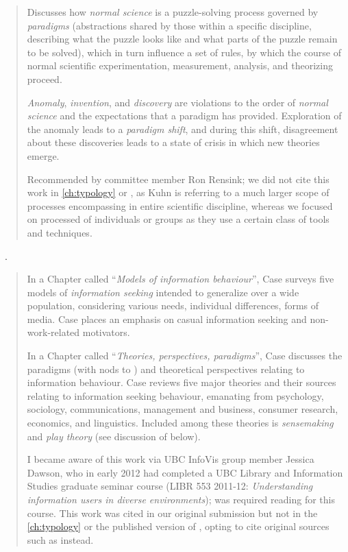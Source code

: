 \begin{quotation}
    Discusses how {\it normal science} is a puzzle-solving process governed by {\it paradigms} (abstractions shared by those within a specific discipline, describing what the puzzle looks like and what parts of the puzzle remain to be solved), which in turn influence a set of rules, by which the course of normal scientific experimentation, measurement, analysis, and theorizing proceed. 
    
    {\it Anomaly}, {\it invention}, and {\it discovery} are violations to the order of {\it normal science} and the expectations that a paradigm has provided.
    Exploration of the anomaly leads to a {\it paradigm shift}, and during this shift, disagreement about these discoveries leads to a state of crisis in which new theories emerge.
    
    Recommended by committee member Ron Rensink; we did not cite this work in \autoref{ch:typology} or \citet{Brehmer2013}, as Kuhn is referring to a much larger scope of processes encompassing in entire scientific discipline, whereas we focused on processed of individuals or groups as they use a certain class of tools and techniques.
\end{quotation}

\begin{sloppypar}
~\cite{Case2008}. \end{sloppypar}

\begin{quotation}
    In a Chapter called ``{\it Models of information behaviour}'', Case surveys five models of {\it information seeking} intended to generalize over a wide population, considering various needs, individual differences, forms of media.
    Case places an emphasis on casual information seeking and non-work-related motivators.
    
    In a Chapter called ``{\it Theories, perspectives, paradigms}'', Case discusses the paradigms (with nods to \citet{Kuhn1962}) and theoretical perspectives relating to information behaviour.
    Case reviews five major theories and their sources relating to information seeking behaviour, emanating from psychology, sociology, communications, management and business, consumer research, economics, and linguistics. 
    Included among these theories is {\it sensemaking} and {\it play theory} (see discussion of \citet{Stephenson1967} below).
    
    I became aware of this work via UBC InfoVis group member Jessica Dawson, who in early 2012 had completed a UBC Library and Information Studies graduate seminar course (LIBR 553 2011-12: {\it Understanding information users in diverse environments}); \citet{Case2008} was required reading for this course. 
    This work was cited in our original submission but not in the  \autoref{ch:typology} or the published version of \citet{Brehmer2013}, opting to cite original sources such as \citet{Toms2000} instead.
\end{quotation}

